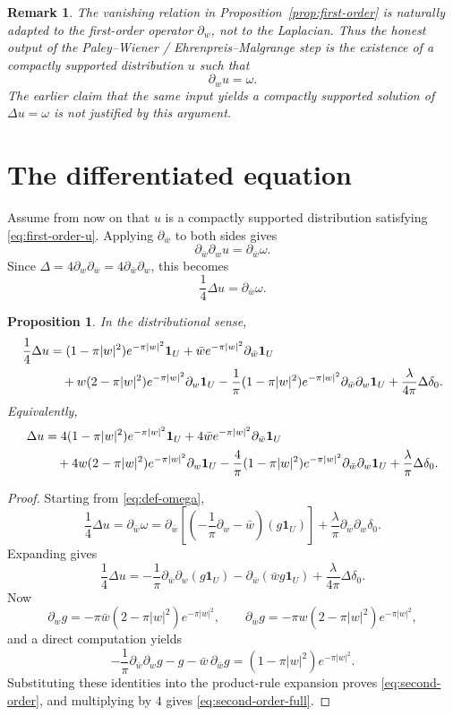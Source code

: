 \documentclass[11pt]{article}
\newtheorem{proposition}[theorem]{Proposition}
\newtheorem{remark}[theorem]{Remark}
\newcommand{\1}{\mathbf 1}
\newcommand{\pw}{\partial_w}
\newcommand{\pwb}{\partial_{\bar w}}
\begin{document}
\begin{remark}\label{rem:ME}
The vanishing relation in Proposition~\ref{prop:first-order} is naturally adapted to the
first-order operator \(\pw\), not to the Laplacian. Thus the honest output of the
Paley--Wiener / Ehrenpreis--Malgrange step is the existence of a compactly supported
distribution \(u\) such that
\begin{equation}\label{eq:first-order-u}
\pw u = \omega.
\end{equation}
The earlier claim that the same input yields a compactly supported solution of
\(\Delta u=\omega\) is not justified by this argument.
\end{remark}

\section{The differentiated equation}

Assume from now on that \(u\) is a compactly supported distribution satisfying
\eqref{eq:first-order-u}. Applying \(\pwb\) to both sides gives
\[
\pwb\pw u = \pwb \omega.
\]
Since \(\Delta=4\pw\pwb=4\pwb\pw\), this becomes
\[
\frac14 \Delta u = \pwb\omega.
\]

\begin{proposition}\label{prop:second-order}
In the distributional sense,
\begin{align}
\frac14 \Delta u
&=
(1-\pi|w|^2)e^{-\pi|w|^2}\1_U
+\bar w e^{-\pi|w|^2}\pwb \1_U \notag\\
&\quad
+w(2-\pi|w|^2)e^{-\pi|w|^2}\pw \1_U
-\frac1\pi(1-\pi|w|^2)e^{-\pi|w|^2}\pwb\pw \1_U
+\frac{\lambda}{4\pi}\Delta\delta_0. \label{eq:second-order}
\end{align}
Equivalently,
\begin{align}
\Delta u
&=
4(1-\pi|w|^2)e^{-\pi|w|^2}\1_U
+4\bar w e^{-\pi|w|^2}\pwb \1_U \notag\\
&\quad
+4w(2-\pi|w|^2)e^{-\pi|w|^2}\pw \1_U
-\frac4\pi(1-\pi|w|^2)e^{-\pi|w|^2}\pwb\pw \1_U
+\frac{\lambda}{\pi}\Delta\delta_0. \label{eq:second-order-full}
\end{align}
\end{proposition}

\begin{proof}
Starting from \eqref{eq:def-omega},
\[
\frac14\Delta u
=
\pwb\omega
=
\pwb\left[\left(-\frac{1}{\pi}\pw-\bar w\right)(g\1_U)\right]
+\frac{\lambda}{\pi}\pwb\pw \delta_0.
\]
Expanding gives
\[
\frac14\Delta u
=
-\frac{1}{\pi}\pwb\pw(g\1_U)
-\pwb(\bar w g\1_U)
+\frac{\lambda}{4\pi}\Delta\delta_0.
\]
Now
\[
\pw g=-\pi \bar w(2-\pi|w|^2)e^{-\pi|w|^2},
\qquad
\pwb g=-\pi w(2-\pi|w|^2)e^{-\pi|w|^2},
\]
and a direct computation yields
\[
-\frac1\pi\pwb\pw g-g-\bar w\,\pwb g
=(1-\pi|w|^2)e^{-\pi|w|^2}.
\]
Substituting these identities into the product-rule expansion proves
\eqref{eq:second-order}, and multiplying by \(4\) gives \eqref{eq:second-order-full}.
\end{proof}
\end{document}
